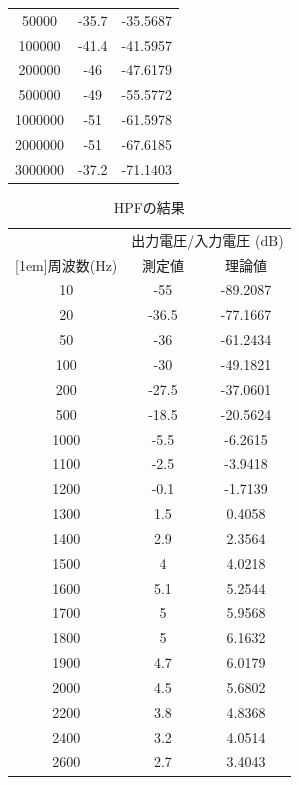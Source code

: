 \documentclass[11pt,a4j]{jsarticle}
\begin{document}
\begin{table}[H]
\begin{center}
\begin{tabular}{|c|c|c|}
        50000	&	-35.7	&	-35.5687	\\
        100000	&	-41.4	&	-41.5957	\\
        200000	&	-46	&	-47.6179	\\
        500000	&	-49	&	-55.5772	\\
        1000000	&	-51	&	-61.5978	\\
        2000000	&	-51	&	-67.6185	\\
        3000000	&	-37.2	&	-71.1403	\\ \hline
      \end{tabular}
  \end{center}
\end{table}

\begin{table}[H]
  \caption{HPFの結果}
  \label{tab:hpf}
  \begin{center}
      \begin{tabular}{|c|c|c|}
        \hline
        & \multicolumn{2}{c|}{出力電圧/入力電圧 ($\mathrm{dB}$)} \\ \cline{2-3}
        \raisebox{0.8em}[1em]{周波数($\mathrm{Hz}$)} & 測定値 & 理論値 \\ \hline
        10	&	-55	&	-89.2087	\\
        20	&	-36.5	&	-77.1667	\\
        50	&	-36	&	-61.2434	\\
        100	&	-30	&	-49.1821	\\
        200	&	-27.5	&	-37.0601	\\
        500	&	-18.5	&	-20.5624	\\
        1000	&	-5.5	&	-6.2615	\\
        1100	&	-2.5	&	-3.9418	\\
        1200	&	-0.1	&	-1.7139	\\
        1300	&	1.5	&	0.4058	\\
        1400	&	2.9	&	2.3564	\\
        1500	&	4	&	4.0218	\\
        1600	&	5.1	&	5.2544	\\
        1700	&	5	&	5.9568	\\
        1800	&	5	&	6.1632	\\
        1900	&	4.7	&	6.0179	\\
        2000	&	4.5	&	5.6802	\\
        2200	&	3.8	&	4.8368	\\
        2400	&	3.2	&	4.0514	\\
        2600	&	2.7	&	3.4043	\\

\end{tabular}
\end{center}
\end{table}
\end{document}
